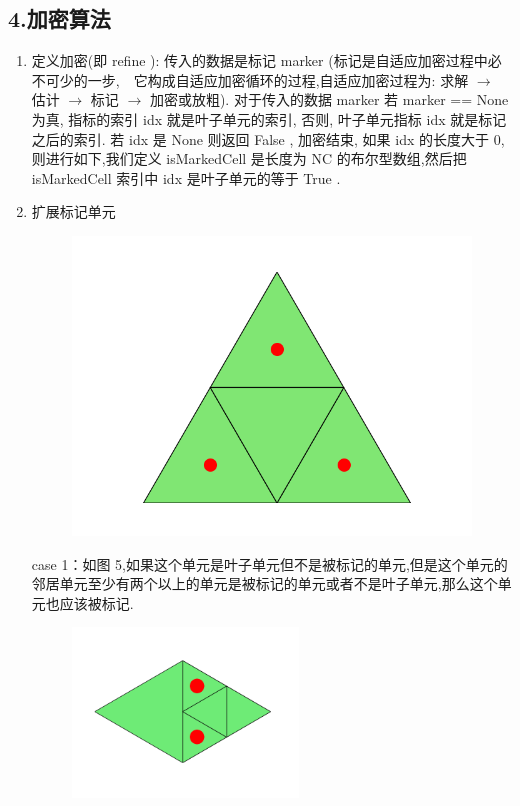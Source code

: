 \documentclass{article}
\begin{document}
\subsection{4.加密算法}
\begin{enumerate}
\item 定义加密(即 refine ): 传入的数据是标记 marker (标记是自适应加密过程中必不可少的一步,　它构成自适应加密循环的过程,自适应加密过程为: 求解 $\to$ 估计 $\to$ 标记 $\to$ 加密或放粗). 对于传入的数据 marker 若 marker == None为真, 指标的索引 idx 就是叶子单元的索引, 否则, 叶子单元指标 idx 就是标记之后的索引. 若 idx 是 None 则返回 False , 加密结束, 
如果 idx 的长度大于 $0$, 则进行如下,我们定义 isMarkedCell 是长度为 NC 的布尔型数组,然后把 isMarkedCell 索引中 idx 是叶子单元的等于 True .
\item 扩展标记单元
\begin{figure}[H]
\centering
\includegraphics[scale=0.5]{./figures/Figure_8.png}
\caption{}
\end{figure}
case 1：如图 5,如果这个单元是叶子单元但不是被标记的单元,但是这个单元的邻居单元至少有两个以上的单元是被标记的单元或者不是叶子单元,那么这个单元也应该被标记.
\begin{figure}[H]
\centering
\begin{minipage}[!htbp]{0.3\linewidth}
    \centerline{\includegraphics[width=6cm]{./figures/Figure_4.png}}

\end{minipage}
\end{figure}
\end{enumerate}
\end{document}
